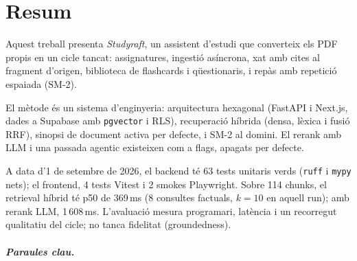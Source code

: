 \chapter*{Resum}

Aquest treball presenta \emph{Studyraft}, un assistent d'estudi que converteix els PDF propis en un cicle tancat: assignatures, ingestió asíncrona, xat amb cites al fragment d'origen, biblioteca de flashcards i qüestionaris, i repàs amb repetició espaiada (SM-2).

El mètode és un sistema d'enginyeria: arquitectura hexagonal (FastAPI i Next.js, dades a Supabase amb \texttt{pgvector} i RLS), recuperació híbrida (densa, lèxica i fusió RRF), sinopsi de document activa per defecte, i SM-2 al domini. El rerank amb LLM i una passada agentic existeixen com a flags, apagats per defecte.

A data d'1 de setembre de 2026, el backend té 63 tests unitaris verds (\texttt{ruff} i \texttt{mypy} nets); el frontend, 4 tests Vitest i 2 smokes Playwright. Sobre 114 chunks, el retrieval híbrid té p50 de 369\,ms (8 consultes factuals, $k=10$ en aquell run); amb rerank LLM, 1\,608\,ms. L'avaluació mesura programari, latència i un recorregut qualitatiu del cicle; no tanca fidelitat (groundedness).

\paragraph{Paraules clau.}
\tfmKeywordsCA
